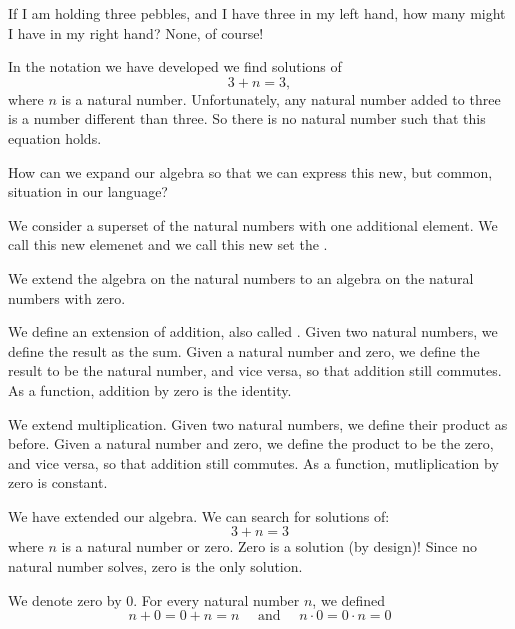 
\sbasic










\sstart
{}


If I am holding
three pebbles, and I have three
in my left hand, how many
might I have in my right hand?
None, of course!

In the notation we have developed
we find solutions of
\[
  3 + n = 3,
\]
where $n$ is a natural number.
Unfortunately, any natural number
added to three is a number different
than three.
So there is no natural number
such that this equation holds.

How can we expand our algebra
so that we can express this
new, but common, situation in
our language?


We consider a superset
of the natural numbers with
one additional element.
We call this new elemenet
and we call this new set
the
.


We extend the algebra on
the natural numbers to an
algebra on the natural numbers
with zero.

We define an extension of addition,
also called
.
Given two natural
numbers, we define the
result as the sum.
Given a natural number
and zero,
we define the result
to be the natural number,
and vice versa,
so that addition
still commutes.
As a function, addition
by zero is the identity.

We extend multiplication.
Given two natural
numbers, we define their
product as before.
Given a natural number
and zero,
we define the product
to be the zero,
and vice versa,
so that addition
still commutes.
As a function, mutliplication
by zero is constant.


We have extended our algebra.
We can search for solutions of:
\[
  3 + n = 3
\]
where $n$ is a natural
number or zero.
Zero is a solution (by design)!
Since no natural number
solves, zero is
the only solution.


We denote zero by $0$.
For every natural number
$n$, we defined
\[
  n + 0 = 0 + n = n \quad \text{ and } \quad n \cdot 0 = 0 \cdot n = 0
\]
\strats
